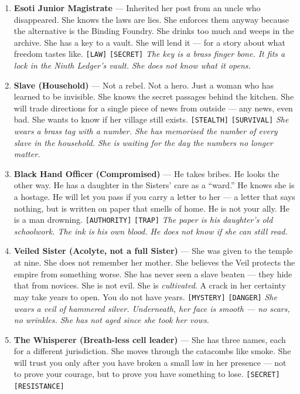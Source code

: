 \begin{enumerate}
  \hfill \textit{She has forgotten the taste of honey. She would like to remember.}
\item \textbf{Esoti Junior Magistrate} --- Inherited her post from an uncle who disappeared. She knows the laws are lies. She enforces them anyway because the alternative is the Binding Foundry. She drinks too much and weeps in the archive. She has a key to a vault. She will lend it --- for a story about what freedom tastes like. \texttt{[LAW]} \texttt{[SECRET]}
  \hfill \textit{The key is a brass finger bone. It fits a lock in the Ninth Ledger's vault. She does not know what it opens.}
\item \textbf{Slave (Household)} --- Not a rebel. Not a hero. Just a woman who has learned to be invisible. She knows the secret passages behind the kitchen. She will trade directions for a single piece of news from outside --- any news, even bad. She wants to know if her village still exists. \texttt{[STEALTH]} \texttt{[SURVIVAL]}
  \hfill \textit{She wears a brass tag with a number. She has memorised the number of every slave in the household. She is waiting for the day the numbers no longer matter.}
\item \textbf{Black Hand Officer (Compromised)} --- He takes bribes. He looks the other way. He has a daughter in the Sisters' care as a ``ward.'' He knows she is a hostage. He will let you pass if you carry a letter to her --- a letter that says nothing, but is written on paper that smells of home. He is not your ally. He is a man drowning. \texttt{[AUTHORITY]} \texttt{[TRAP]}
  \hfill \textit{The paper is his daughter's old schoolwork. The ink is his own blood. He does not know if she can still read.}
\item \textbf{Veiled Sister (Acolyte, not a full Sister)} --- She was given to the temple at nine. She does not remember her mother. She believes the Veil protects the empire from something worse. She has never seen a slave beaten --- they hide that from novices. She is not evil. She is \emph{cultivated}. A crack in her certainty may take years to open. You do not have years. \texttt{[MYSTERY]} \texttt{[DANGER]}
  \hfill \textit{She wears a veil of hammered silver. Underneath, her face is smooth --- no scars, no wrinkles. She has not aged since she took her vows.}
\item[J] \textbf{The Whisperer (Breath-less cell leader)} --- She has three names, each for a different jurisdiction. She moves through the catacombs like smoke. She will trust you only after you have broken a small law in her presence --- not to prove your courage, but to prove you have something to lose. \texttt{[SECRET]} \texttt{[RESISTANCE]}

\end{enumerate}
